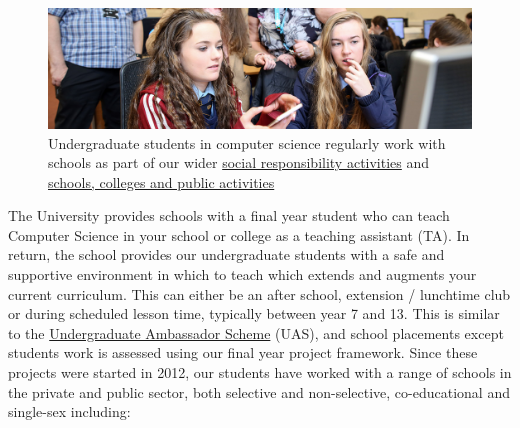\documentclass[
  12pt,
]{book}
\begin{document}
\begin{figure}

{\centering \includegraphics[width=1\linewidth]{images/schools-banner} 

}

\caption{Undergraduate students in computer science regularly work with schools as part of our wider \href{https://www.cs.manchester.ac.uk/connect/social-responsibility/}{social responsibility activities} \citep{m2020, m20202} and \href{https://www.cs.manchester.ac.uk/connect/schools-colleges-public/}{schools, colleges and public activities}}\label{fig:unnamed-chunk-6}
\end{figure}

The University provides schools with a final year student who can teach Computer Science in your school or college as a teaching assistant (TA). In return, the school provides our undergraduate students with a safe and supportive environment in which to teach which extends and augments your current curriculum. This can either be an after school, extension / lunchtime club or during scheduled lesson time, typically between year 7 and 13. This is similar to the \href{https://en.wikipedia.org/wiki/Undergraduate_Ambassadors_Scheme}{Undergraduate Ambassador Scheme} (UAS), \citep{uas, Cooper2005} and school placements \citep{Moller2019} except students work is assessed using our final year project framework. \citep{COMP30030, COMP30040} Since these projects were started in 2012, our students have worked with a range of schools in the private and public sector, both selective and non-selective, co-educational and single-sex including:
\end{document}
